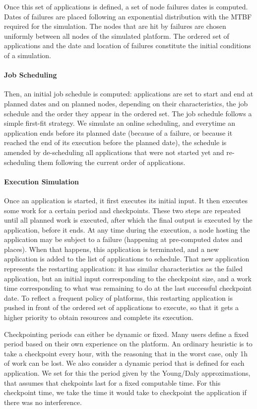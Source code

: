 Once this set of applications is defined, a set of node failures dates
is computed. Dates of failures are placed following an exponential
distribution with the MTBF required for the simulation. The nodes that
are hit by failures are chosen uniformly between all nodes of the
simulated platform. The ordered set of applications and the date and
location of failures constitute the initial conditions of a simulation.

\paragraph*{Job Scheduling}
Then, an initial job schedule is computed: applications are set to
start and end at planned dates and on planned nodes, depending on
their characteristics, the job schedule and the order they appear in
the ordered set. The job schedule follows a simple first-fit
strategy. We simulate an online scheduling, and everytime an
application ends before its planned date (because of a failure, or
because it reached the end of its execution before the planned date),
the schedule is amended by de-scheduling all applications that were
not started yet and re-scheduling them following the current order of
applications.

\paragraph*{Execution Simulation}
Once an application is started, it first executes its initial
input. It then executes some work for a certain period and
checkpoints. These two steps are repeated until all planned work is
executed, after which the final output is executed by the application,
before it ends. At any time during the execution, a node hosting the
application may be subject to a failure (happening at pre-computed
dates and places). When that happens, this application is terminated,
and a new application is added to the list of applications to
schedule. That new application represents the restarting application:
it has similar characteristics as the failed application, but an
initial input corresponding to the checkpoint size, and a work time
corresponding to what was remaining to do at the last successful
checkpoint date. To reflect a frequent policy of platforms, this
restarting application is pushed in front of the ordered set of
applications to execute, so that it gets a higher priority to obtain
resources and complete its execution.

Checkpointing periods can either be dynamic or fixed. Many users
define a fixed period based on their own experience on the
platform. An ordinary heuristic is to take a checkpoint every hour,
with the reasoning that in the worst case, only 1h of work can be
lost. We also consider a dynamic period that is defined for each
application. We set for this the period given by the Young/Daly
approximations, that assumes that chekpoints last for a fixed
computable time. For this checkpoint time, we take the time it would
take to checkpoint the application if there was no interference.


